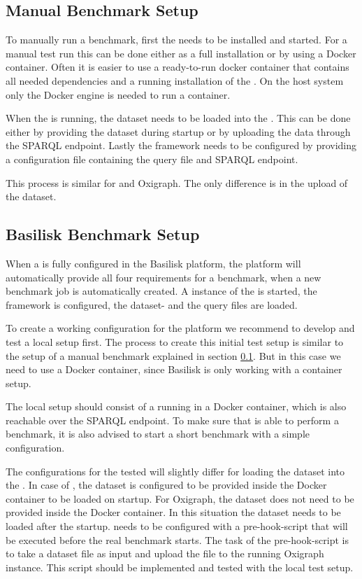\subsection{Manual Benchmark Setup}
\label{sec:eval_manual_benchmark_setup}
To manually run a benchmark, first the \ts{} needs to be installed and started.
For a manual test run this can be done either as a full installation or by using a Docker container.
Often it is easier to use a ready-to-run docker container that contains all needed dependencies and a running installation of the \ts{}.
On the host system only the Docker engine is needed to run a container.

When the \ts{} is running, the dataset needs to be loaded into the \ts{}.
This can be done either by providing the dataset during startup or by uploading the data through the SPARQL endpoint.
Lastly the \iguana{} framework needs to be configured by providing a configuration file containing the query file and SPARQL endpoint.

This process is similar for \tentris{} and Oxigraph.
The only difference is in the upload of the dataset.


\subsection{Basilisk Benchmark Setup}
When a \ts{} is fully configured in the Basilisk platform, the platform will automatically provide all four requirements for a benchmark, when a new benchmark job is automatically created.
A instance of the \ts{} is started, the \iguana{} framework is configured, the dataset- and the query files are loaded.

To create a working \ts{} configuration for the platform we recommend to develop and test a local setup first.
The process to create this initial test setup is similar to the setup of a manual benchmark explained in section \ref{sec:eval_manual_benchmark_setup}.
But in this case we need to use a Docker container, since Basilisk is only working with a container setup.

The local setup should consist of a \ts{} running in a Docker container, which is also reachable over the SPARQL endpoint.
To make sure that \iguana{} is able to perform a benchmark, it is also advised to start a short benchmark with a simple \iguana{} configuration.

The \iguana{} configurations for the tested \tsp{} will slightly differ for loading the dataset into the \ts{}.
In case of \tentris{}, the dataset is configured to be provided inside the Docker container to be loaded on startup.
For Oxigraph, the dataset does not need to be provided inside the Docker container.
In this situation the dataset needs to be loaded after the startup.
\iguana{} needs to be configured with a pre-hook-script that will be executed before the real benchmark starts.
The task of the pre-hook-script is to take a dataset file as input and upload the file to the running Oxigraph instance.
This script should be implemented and tested with the local test setup.

